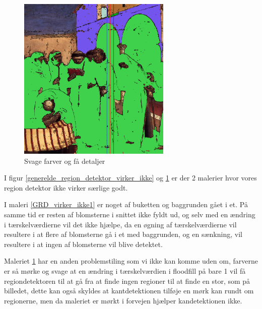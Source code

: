 \begin{figure}[!h]
	\begin{center}
	    \includegraphics[angle=0,width=0.65\textwidth]{afsnit/afprovning/billeder/thressholds/svage_farver/svage_detalier/floodfill/4-4.png}
	\end{center}    
	\caption{Svage farver og få detaljer}
    \label{GRD_virker_ikke2}
\end{figure}

I figur \ref{generelde_region_detektor_virker_ikke} og
\ref{GRD_virker_ikke2} er der 2 malerier hvor
vores region detektor ikke virker særlige godt. 

I maleri \ref{GRD_virker_ikke1} er noget af buketten og baggrunden gået
i et. På samme tid er resten af blomsterne i snittet ikke fyldt ud, og
selv med en ændring i tærskelværdierne vil det ikke hjælpe, da en øgning
af tærskelværdierne vil resultere i at flere af blomsterne gå i et med
baggrunden, og en sænkning, vil resultere i at ingen af blomsterne vil
blive detektet. 

Maleriet \ref{GRD_virker_ikke2} har en anden problemstiling som vi ikke
kan komme uden om, farverne er så mørke og svage at en ændring i
tærskelværdien i floodfill på bare 1 vil få regiondetektoren til at gå
fra at finde ingen regioner til at finde en stor, som på billedet, dette
kan også skyldes at kantdetektionen tilføje en mørk kan rundt om
regionerne, men da maleriet er mørkt i forvejen hjælper kandetektionen
ikke.

